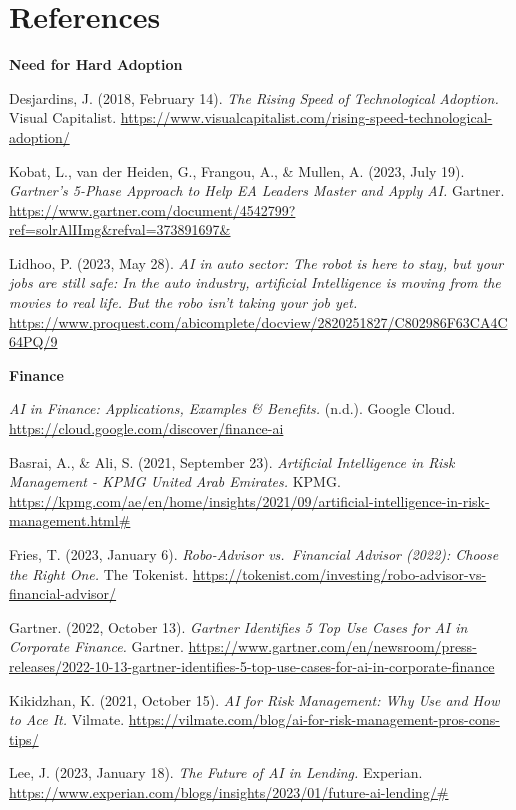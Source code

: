 \documentclass[
]{article}
\begin{document}
\hypertarget{references}{%
\section{References}\label{references}}

\textbf{Need for Hard Adoption}

Desjardins, J. (2018, February 14). \emph{The Rising Speed of Technological Adoption.} Visual Capitalist. \url{https://www.visualcapitalist.com/rising-speed-technological-adoption/}

Kobat, L., van der Heiden, G., Frangou, A., \& Mullen, A. (2023, July 19). \emph{Gartner's 5-Phase Approach to Help EA Leaders Master and Apply AI.} Gartner. \url{https://www.gartner.com/document/4542799?ref=solrAlIImg\&refval=373891697\&}

Lidhoo, P. (2023, May 28). \emph{AI in auto sector: The robot is here to stay, but your jobs are still safe: In the auto industry, artificial Intelligence is moving from the movies to real life. But the robo isn't taking your job yet.} \url{https://www.proquest.com/abicomplete/docview/2820251827/C802986F63CA4C64PQ/9}

\textbf{Finance}

\emph{AI in Finance: Applications, Examples \& Benefits.} (n.d.). Google Cloud. \url{https://cloud.google.com/discover/finance-ai}

Basrai, A., \& Ali, S. (2021, September 23). \emph{Artificial Intelligence in Risk Management - KPMG United Arab Emirates.} KPMG. \url{https://kpmg.com/ae/en/home/insights/2021/09/artificial-intelligence-in-risk-management.html\#}

Fries, T. (2023, January 6). \emph{Robo-Advisor vs.~Financial Advisor (2022): Choose the Right One.} The Tokenist. \url{https://tokenist.com/investing/robo-advisor-vs-financial-advisor/}

Gartner. (2022, October 13). \emph{Gartner Identifies 5 Top Use Cases for AI in Corporate Finance.} Gartner. \url{https://www.gartner.com/en/newsroom/press-releases/2022-10-13-gartner-identifies-5-top-use-cases-for-ai-in-corporate-finance}

Kikidzhan, K. (2021, October 15). \emph{AI for Risk Management: Why Use and How to Ace It.} Vilmate. \url{https://vilmate.com/blog/ai-for-risk-management-pros-cons-tips/}

Lee, J. (2023, January 18). \emph{The Future of AI in Lending.} Experian. \url{https://www.experian.com/blogs/insights/2023/01/future-ai-lending/\#}
\end{document}
